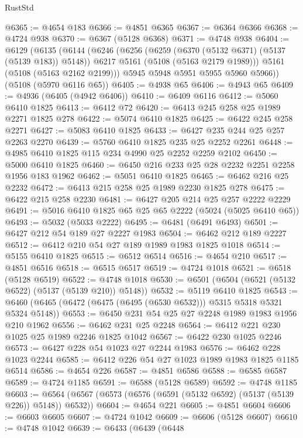 \begin{lexlean}{RustStd}
\begin{coremodule}
@6365 := @4654 @183
@6366 := @4851 @6365
@6367 := @6364 @6366
@6368 := @4724 @938
@6370 := @6367 (@5128 @6368)
@6371 := @4748 @938
@6404 := @6129
    (@6135
      (@6144
        (@6246
          (@6256
            (@6259 (@6370 (@5132 @6371) (@5137 (@5139 @183)) @5148))
            @6217
            @5161
            (@5108 (@5163 @2179 @1989)))
          @5161
          (@5108 (@5163 @2162 @2199)))
        @5945
        @5948
        @5951
        @5955
        @5960
        @5966))
    (@5108 (@5970 @6116 @65))
@6405 := @4938 @65
@6406 := @4943 @65
@6409 := @4936 (@6405 (@4942 @6406))
@6410 := @6409 @6116
@6412 := @5060 @6410 @1825
@6413 := @6412 @72
@6420 := @6413 @245 @258 @25 @1989 @2271 @1825 @278
@6422 := @5074 @6410 @1825
@6425 := @6422 @245 @258 @2271
@6427 := @5083 @6410 @1825
@6433 := @6427 @235 @244 @25 @257 @2263 @2270
@6439 := @5760 @6410 @1825 @235 @25 @2252 @2261
@6448 := @4985 @6410 @1825 @115 @234 @4990 @25 @2252 @2259 @2102
@6450 := @5000 @6410 @1825
@6460 := @6450 @216 @233 @25 @28 @2232 @2251 @2258 @1956 @183 @1962
@6462 := @5051 @6410 @1825
@6465 := @6462 @216 @25 @2232
@6472 := @6413 @215 @258 @25 @1989 @2230 @1825 @278
@6475 := @6422 @215 @258 @2230
@6481 := @6427 @205 @214 @25 @257 @2222 @2229
@6491 := @5016 @6410 @1825 @65 @25 @65 @2222 (@5024 (@5025 @6410 @65))
@6493 := @5032 (@5033 @2222)
@6495 := @6481 (@6491 @6493)
@6501 := @6427 @212 @54 @189 @27 @2227 @1983
@6504 := @6462 @212 @189 @2227
@6512 := @6412 @210 @54 @27 @189 @1989 @1983 @1825 @1018
@6514 := @5155 @6410 @1825
@6515 := @6512 @6514
@6516 := @4654 @210
@6517 := @4851 @6516
@6518 := @6515 @6517
@6519 := @4724 @1018
@6521 := @6518 (@5128 @6519)
@6522 := @4748 @1018
@6530 := @6501 (@6504 (@6521 (@5132 @6522) (@5137 (@5139 @210)) @5148))
@6532 := @5119 @6410 @1825
@6543 := @6460 (@6465 (@6472 (@6475 (@6495 (@6530 @6532))) @5315 @5318 @5321 @5324 @5148))
@6553 := @6450 @231 @54 @25 @27 @2248 @1989 @1983 @1956 @210 @1962
@6556 := @6462 @231 @25 @2248
@6564 := @6412 @221 @230 @1025 @25 @1989 @2246 @1825 @1042
@6567 := @6422 @230 @1025 @2246
@6573 := @6427 @228 @54 @1023 @27 @2244 @1983
@6576 := @6462 @228 @1023 @2244
@6585 := @6412 @226 @54 @27 @1023 @1989 @1983 @1825 @1185 @6514
@6586 := @4654 @226
@6587 := @4851 @6586
@6588 := @6585 @6587
@6589 := @4724 @1185
@6591 := @6588 (@5128 @6589)
@6592 := @4748 @1185
@6603 := @6564 (@6567 (@6573 (@6576 (@6591 (@5132 @6592) (@5137 (@5139 @226)) @5148)) @6532))
@6604 := @4654 @221
@6605 := @4851 @6604
@6606 := @6603 @6605
@6607 := @4724 @1042
@6609 := @6606 (@5128 @6607)
@6610 := @4748 @1042
@6639 := @6433
    (@6439
      (@6448

\end{coremodule}
\end{lexlean}
